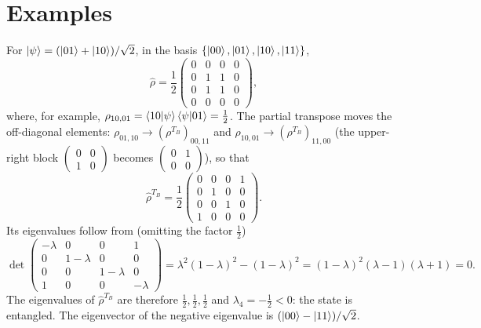 \section{Examples}
\begin{example}
For $\left|\psi\right\rangle=(\left|01\right\rangle+\left|10\right\rangle)/\sqrt2$, in the basis $\{\left|00\right\rangle,\left|01\right\rangle,\left|10\right\rangle,\left|11\right\rangle\}$,
\begin{equation}
  \hat\rho=\frac12\begin{pmatrix}0&0&0&0\\0&1&1&0\\0&1&1&0\\0&0&0&0\end{pmatrix},
\end{equation}
where, for example, $\rho_{10,01}=\left\langle10\middle|\psi\right\rangle\left\langle\psi\middle|01\right\rangle=\frac12$. The partial transpose moves the off-diagonal elements: $\rho_{01,10}\to(\rho^{T_B})_{00,11}$ and
$\rho_{10,01}\to(\rho^{T_B})_{11,00}$ (the upper-right block $\begin{pmatrix}0&0\\1&0\end{pmatrix}$ becomes $\begin{pmatrix}0&1\\0&0\end{pmatrix}$), so that
\begin{equation}
  \hat\rho^{T_B}=\frac12\begin{pmatrix}0&0&0&1\\0&1&0&0\\0&0&1&0\\1&0&0&0\end{pmatrix}.
\end{equation}
Its eigenvalues follow from (omitting the factor $\frac12$)
\begin{equation}
  \det\begin{pmatrix}-\lambda&0&0&1\\0&1-\lambda&0&0\\0&0&1-\lambda&0\\1&0&0&-\lambda\end{pmatrix}=\lambda^2(1-\lambda)^2-(1-\lambda)^2=(1-\lambda)^2(\lambda-1)(\lambda+1)=0.
\end{equation}
The eigenvalues of $\hat\rho^{T_B}$ are therefore $\frac12,\frac12,\frac12$ and $\lambda_4=-\frac12<0$: the state is entangled. The eigenvector of the negative eigenvalue is
$(\left|00\right\rangle-\left|11\right\rangle)/\sqrt2$.
\end{example}

